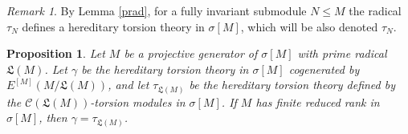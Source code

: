 \documentclass{amsart}
\newtheorem{prop}[thm]{Proposition}
\theoremstyle{definition}
\theoremstyle{remark}
\newtheorem{rem}[thm]{Remark}
\numberwithin{equation}{section}
\newcommand{\sm}{\sigma[M]}
\begin{document}
\begin{rem}
	By Lemma \ref{prad}, 
	for a fully invariant submodule $N\leq M$ 
	the radical $\tau_N$ defines a hereditary torsion theory in $\sm$, 
	which will be also denoted $\tau_N$.
\end{rem}

\begin{prop}\label{ctorgamma}
	Let $M$ be a projective generator of $\sm$ 
	with prime radical $\mathfrak{L}(M)$. 
	Let $\gamma$ be the hereditary torsion theory in $\sm$ 
	cogenerated by $E^{[M]}(M/\mathfrak{L}(M))$, 
	and let $\tau_{\mathfrak{L}(M)}$ be the hereditary torsion theory 
	defined by the $\mathcal{C}(\mathfrak{L}(M))$-torsion modules in $\sm$. 
	If $M$ has finite reduced rank in $\sm$, 
	then $\gamma=\tau_{\mathfrak{L}(M)}$.
\end{prop}
\end{document}
